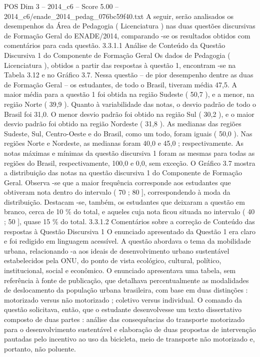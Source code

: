\begin{textsample}{POS Dim 3 – 2014\_c6 – Score 5.00 – 2014\_c6/enade\_2014\_pedag\_076bc59f40.txt}
A seguir, serão analisados os desempenhos da Área de Pedagogia ( Licenciatura ) nas duas questões discursivas de Formação Geral do ENADE/2014, comparando -se os resultados obtidos com comentários para cada questão. 3.3.1.1 Análise de Conteúdo da Questão Discursiva 1 do Componente de Formação Geral Os dados de Pedagogia ( Licenciatura ), obtidos a partir das respostas à questão 1, encontram -se na Tabela 3.12 e no Gráfico 3.7.
Nessa questão – de pior desempenho dentre as duas de Formação Geral – os estudantes, de todo o Brasil, tiveram média 47,5.
A maior média para a questão 1 foi obtida na região Sudeste ( 50,7 ), e a menor, na região Norte ( 39,9 ).
Quanto à variabilidade das notas, o desvio padrão de todo o Brasil foi 31,0.
O menor desvio padrão foi obtido na região Sul ( 30,2 ), e o maior desvio padrão foi obtido na região Nordeste ( 31,8 ).
As medianas das regiões Sudeste, Sul, Centro-Oeste e do Brasil, como um todo, foram iguais ( 50,0 ).
Nas regiões Norte e Nordeste, as medianas foram 40,0 e 45,0 ; respectivamente.
As notas máximas e mínimas da questão discursiva 1 foram as mesmas para todas as regiões do Brasil, respectivamente, 100,0 e 0,0, sem exceção.
O Gráfico 3.7 mostra a distribuição das notas na questão discursiva 1 do Componente de Formação Geral.
Observa -se que a maior frequência corresponde aos estudantes que obtiveram nota dentro do intervalo ( 70 ; 80 ], correspondendo à moda da distribuição.
Destacam -se, também, os estudantes que deixaram a questão em branco, cerca de 10 \% do total, e aqueles cuja nota ficou situada no intervalo ( 40 ; 50 ], quase 15 \% do total. 3.3.1.2 Comentários sobre a correção de Conteúdo das respostas à Questão Discursiva 1 O enunciado apresentado da Questão 1 era claro e foi redigido em linguagem acessível.
A questão abordava o tema da mobilidade urbana, relacionando -a aos ideais de desenvolvimento urbano sustentável estabelecidos pela ONU, do ponto de vista ecológico, cultural, político, institucional, social e econômico.
O enunciado apresentava uma tabela, sem referência à fonte de publicação, que detalhava percentualmente as modalidades de deslocamento da população urbana brasileira, com base em duas distinções : motorizado versus não motorizado ; coletivo versus individual.
O comando da questão solicitava, então, que o estudante desenvolvesse um texto dissertativo composto de duas partes : análise das consequências do transporte motorizado para o desenvolvimento sustentável e elaboração de duas propostas de intervenção pautadas pelo incentivo ao uso da bicicleta, meio de transporte não motorizado e, portanto, não poluente.

\end{textsample}
